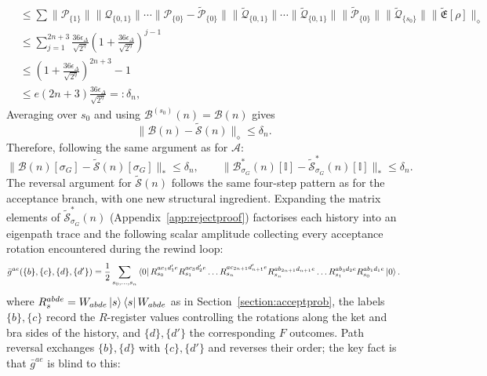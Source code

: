 \documentclass[aps,floatfix,10pt,amssymb,amsfont,amsmath,superscriptaddress,float,nofootinbib,longbibliography,nobalancelastpage,twocolumn]{revtex4-2}
\begin{document}
\begin{widetext}
\begin{align}
    &\leq \sum\|\mathcal{P}_{\{1\}}\|\|\mathcal{Q}_{\{0,1\}}\|\cdots\|\mathcal{P}_{\{0\}}-\tilde{\mathcal{P}}_{\{0\}}\|\|\tilde{\mathcal{Q}}_{\{0,1\}}\|\cdots\|\tilde{\mathcal{Q}}_{\{0,1\}}\|\|\tilde{\mathcal{P}}_{\{0\}}\|\|\tilde{\mathcal{Q}}_{\{s_0\}}\|\|\tilde{\mathfrak{E}}[\rho]\|_{\diamond}\\
    &\leq  \sum_{j=1}^{2n+3}\frac{36\epsilon_{\Delta}}{\sqrt{2^{\eta}}}(1+\frac{36\epsilon_{\Delta}}{\sqrt{2^{\eta}}})^{j-1}\\
    &\leq  (1+\frac{36\epsilon_{\Delta}}{\sqrt{2^{\eta}}})^{2n+3}-1\\
     &\leq e(2n+3)\frac{36\epsilon_{\Delta}}{\sqrt{2^{\eta}}}=: \delta_n,
\end{align}
 Averaging over $s_0$ and
using $\mathcal B^{(s_0)}(n)=\mathcal B(n)$ gives
\begin{equation}
    \|\mathcal B(n)-\tilde{\mathcal S}(n)\|_\diamond\leq\delta_n.
\end{equation}
Therefore, following the same argument as for $\mathcal{A}$:
\begin{equation}
    \|\mathcal{B}(n)[\sigma_G] - \tilde{\mathcal{S}}(n)[\sigma_G]\|_* \leq \delta_n,
    \qquad \|\mathcal{B}^*_{\sigma_G}(n)[\mathbb{I}] - \tilde{\mathcal{S}}^*_{\sigma_G}(n)[\mathbb{I}]\|_* \leq \delta_n.
    \label{eq:Bsrelation}
\end{equation}
The reversal argument for $\tilde{\mathcal{S}}(n)$ follows the same four-step pattern as for the acceptance branch, with one new structural ingredient. Expanding the matrix elements of $\tilde{\mathcal{S}}^*_{\sigma_G}(n)$ (Appendix~\ref{app:rejectproof}) factorises each history into an eigenpath trace and the following scalar amplitude collecting every acceptance rotation encountered during the rewind loop:
\begin{equation}
       \bar g^{ae}(\{b\},\{c\},\{d\},\{d'\}) = \frac12\sum_{s_0,\ldots,s_n}
       \bra{0}R_{s_0}^{ac_1d'_1e}R_{s_1}^{ac_3d'_2e}\ldots
       R_{s_n}^{ac_{2n+1}d'_{n+1}e} R_{s_n}^{ab_{2n+1}d_{n+1}e}\ldots
       R_{s_1}^{ab_3d_2e}R_{s_0}^{ab_1d_1e}\ket{0}.
       \label{eq:gbar-definition}
\end{equation}
where $R^{abde}_s = W_{abde}\ket{s}\bra{s}W_{abde}$ as in Section~\ref{section:acceptprob}, the labels $\{b\},\{c\}$ record the $R$-register values controlling the rotations along the ket and bra sides of the history, and $\{d\},\{d'\}$ the corresponding $F$ outcomes. Path reversal exchanges $\{b\},\{d\}$ with $\{c\},\{d'\}$ and reverses their order; the key fact is that $\bar g^{ae}$ is blind to this:

\end{widetext}
\end{document}
